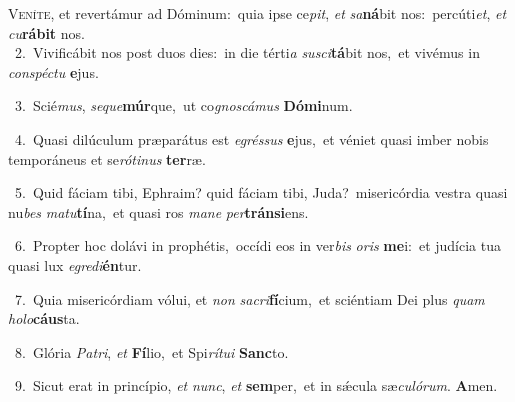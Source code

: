 \lettrine{\initial\textcolor{\initialcolor}{V}}{eníte,} et revertámur ad Dóminum:~\dagger quia ipse ce\-\textit{pit}\-, \textit{et} \textit{sa}\-\textbf{ná}bit nos:~\star percúti\-\textit{et}\-, \textit{et} \textit{cu}\-\textbf{rá}\textbf{bit} nos.\\
{\numbfont\textcolor{\numbcolor}{~2.}}~Vivificábit nos post duos dies:~\dagger in die térti\textit{a} \textit{su}\-\textit{sci}\textbf{tá}bit nos,~\star et vivémus in \textit{con}\-\textit{spéc}\textit{tu} \textbf{e}\-jus.\par
{\numbfont\textcolor{\numbcolor}{~3.}}~Scié\-\textit{mus}\-, \textit{se}\-\textit{que}\textbf{múr}que,~\star ut co\-\textit{gnos}\-\textit{cá}\textit{mus} \textbf{Dó}\-\textbf{mi}num.\par
{\numbfont\textcolor{\numbcolor}{~4.}}~Quasi dilúculum præparátus est \textit{e}\-\textit{grés}\textit{sus} \textbf{e}\-jus,~\star et véniet quasi imber nobis temporáneus et se\-\textit{ró}\-\textit{ti}\textit{nus} \textbf{ter}\-ræ.\par
{\numbfont\textcolor{\numbcolor}{~5.}}~Quid fáciam tibi, Ephraim? quid fáciam tibi, Juda?~\dagger misericórdia vestra quasi nu\textit{bes} \textit{ma}\-\textit{tu}\textbf{tí}na,~\star et quasi ros \textit{ma}\-\textit{ne} \textit{per}\-\textbf{tráns}\textbf{i}ens.\par
{\numbfont\textcolor{\numbcolor}{~6.}}~Propter hoc dolávi in prophétis,~\dagger occídi eos in ver\textit{bis} \textit{o}\-\textit{ris} \textbf{me}\-i:~\star et judícia tua quasi lux \textit{e}\-\textit{gre}\textit{di}\textbf{én}tur.\par
{\numbfont\textcolor{\numbcolor}{~7.}}~Quia misericórdiam vólui, et \textit{non} \textit{sa}\-\textit{cri}\textbf{fí}cium,~\star et sciéntiam Dei plus \textit{quam} \textit{ho}\-\textit{lo}\textbf{cáus}ta.\par
{\numbfont\textcolor{\numbcolor}{~8.}}~Glória \textit{Pa}\-\textit{tri}, \textit{et} \textbf{Fí}\-lio,~\star et Spi\-\textit{rí}\-\textit{tu}\textit{i} \textbf{Sanc}\-to.\par
{\numbfont\textcolor{\numbcolor}{~9.}}~Sicut erat in princípio, \textit{et} \textit{nunc}\-, \textit{et} \textbf{sem}\-per,~\star et in sǽcula sæ\-\textit{cu}\-\textit{ló}\textit{rum}. \textbf{A}\-men.\par
